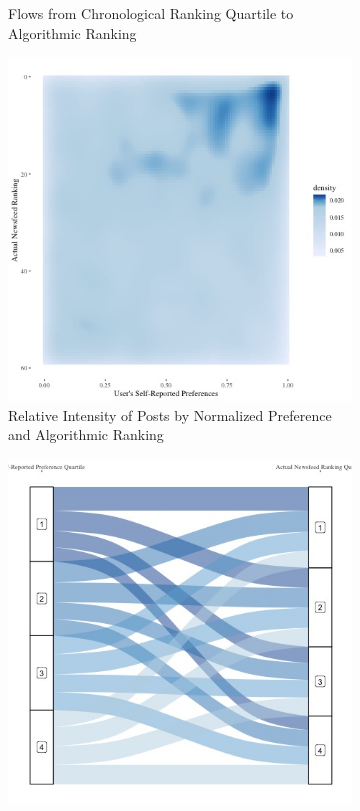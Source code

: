 \documentclass[12pt,letterpaper]{article}
\begin{document}
\begin{figure}[ht]
\begin{subfigure}{.5\textwidth}
        \caption{Flows from Chronological Ranking Quartile to Algorithmic Ranking}
         \label{fig:nftime_s}
    \end{subfigure}

   \begin{subfigure}{.5\textwidth} 
        \centering
        \includegraphics[width=1\linewidth]{Output/Graphs/Audit/Heatmaps/US NF norm pref rank by nf rank - smooth.jpg}  
        \caption{Relative Intensity of Posts by Normalized Preference  and Algorithmic Ranking}
        \label{fig:nfpref_hm}
        \end{subfigure}
    \begin{subfigure}{.5\textwidth}
        \centering
        \includegraphics[width=1\linewidth]{Output/Graphs/Audit/Sankey flows/US NF norm quartile to actual.jpg}  

\end{subfigure}
\end{figure}
\end{document}
